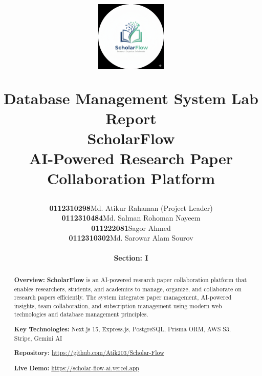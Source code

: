 \documentclass[12pt,a4paper]{report}
\title{
    \vspace{-2cm}
    \begin{figure}[h]
    \centering
    \includegraphics[width=0.3\textwidth]{images/logos/logo.png}
    \end{figure}
    \vspace{0.3cm}
    {\Large\textbf{Database Management System Lab Report}}\\
    \vspace{0.4cm}
    {\LARGE\textbf{ScholarFlow}}\\
    \vspace{0.3cm}
    {\large AI-Powered Research Paper Collaboration Platform}\\
    \vspace{0.5cm}
  
}
\author{
    \begin{tabular}{rl}
    \textbf{0112310298} & Md. Atikur Rahaman (Project Leader) \\
    \textbf{0112310484} & Md. Salman Rohoman Nayeem \\
    \textbf{011222081} & Sagor Ahmed \\
    \textbf{0112310302} & Md. Sarowar Alam Sourov \\
    \end{tabular}
    \\[0.75cm]
    {\normalsize\textbf{Section: I}}
}
\newcommand{\projectname}{\textbf{ScholarFlow}}
\begin{document}
\maketitle
\thispagestyle{empty}

\newpage

\begin{abstract}
\noindent
\textbf{Overview:} \projectname{} is an AI-powered research paper collaboration platform that enables researchers, students, and academics to manage, organize, and collaborate on research papers efficiently. The system integrates paper management, AI-powered insights, team collaboration, and subscription management using modern web technologies and database management principles.

\vspace{0.3cm}
\noindent
\textbf{Key Technologies:} Next.js 15, Express.js, PostgreSQL, Prisma ORM, AWS S3, Stripe, Gemini AI

\vspace{0.3cm}
\noindent
\textbf{Repository:} \url{https://github.com/Atik203/Scholar-Flow}

\vspace{0.3cm}
\noindent
\textbf{Live Demo:} \url{https://scholar-flow-ai.vercel.app}
\end{abstract}

\newpage

\tableofcontents
\newpage














\nocite{*}


\end{document}
